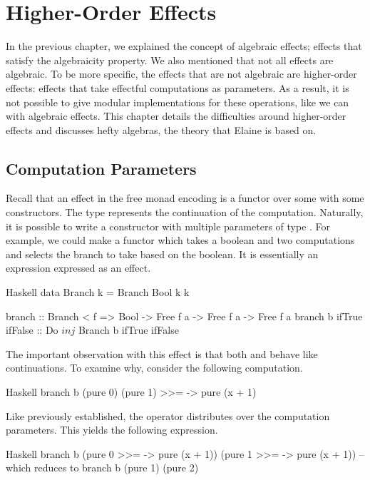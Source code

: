 \chapter{Higher-Order Effects}\label{chap:higher_order}

In the previous chapter, we explained the concept of algebraic effects; effects that satisfy the algebraicity property. We also mentioned that not all effects are algebraic. To be more specific, the effects that are not algebraic are higher-order effects: effects that take effectful computations as parameters. As a result, it is not possible to give modular implementations for these operations, like we can with algebraic effects. This chapter details the difficulties around higher-order effects and discusses hefty algebras, the theory that Elaine is based on.

\section{Computation Parameters}

Recall that an effect in the free monad encoding is a functor over some  with some constructors. The type  represents the continuation of the computation. Naturally, it is possible to write a constructor with multiple parameters of type . For example, we could make a  functor which takes a boolean and two computations and selects the branch to take based on the boolean. It is essentially an  expression expressed as an effect.

\begin{lst}{Haskell}
data Branch k = Branch Bool k k

branch :: Branch < f => Bool -> Free f a -> Free f a -> Free f a
branch b ifTrue ifFalse :: Do $ inj $ Branch b ifTrue ifFalse
\end{lst}

The important observation with this effect is that both  and  behave like continuations. To examine why, consider the following computation.

\begin{lst}{Haskell}
branch b (pure 0) (pure 1) >>= \x -> pure (x + 1)
\end{lst}

Like previously established, the \hs{>>=} operator distributes over the computation parameters. This yields the following expression.

\begin{lst}{Haskell}
branch b
  (pure 0 >>= \x -> pure (x + 1))
  (pure 1 >>= \x -> pure (x + 1))
-- which reduces to
branch b (pure 1) (pure 2)
\end{lst}


